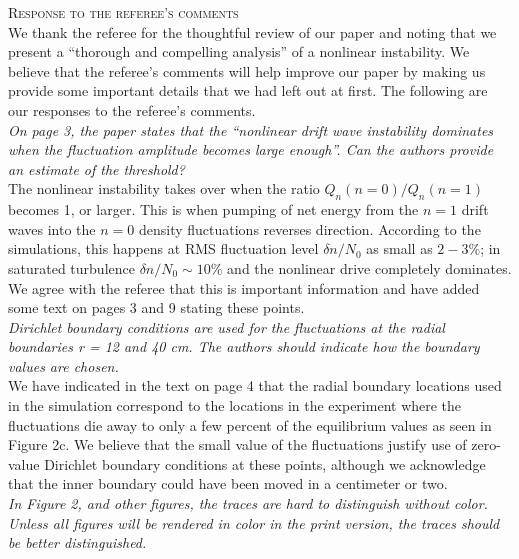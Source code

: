 \documentclass[12pt]{article}
\begin{document}
{\noindent \scshape Response to the referee's comments} \\ 

{\noindent We thank the referee for the thoughtful review of our paper and noting that we present a ``thorough and compelling analysis'' of a nonlinear instability. We believe that the referee's comments will help
improve our paper by making us provide some important details that we had left out at first. The following are our responses to the referee's comments. }\\

{\noindent \itshape  On page 3, the paper states that the “nonlinear drift wave instability dominates when
the fluctuation amplitude becomes large enough”. Can the authors provide an estimate of the threshold? }\\

{\noindent The nonlinear instability takes over when the ratio $Q_n(n=0)/Q_n(n=1)$ becomes 1, or larger. This is when pumping of net energy from the $n=1$ drift waves
into the $n=0$ density fluctuations reverses direction. According to the simulations, this happens at RMS fluctuation level $\delta n/N_0$ as small as $2-3\%$;
in saturated turbulence $\delta n/N_0 \sim 10 \%$ and the nonlinear drive completely dominates.
We agree with the referee that this is important information and have added some text on pages 3 and 9 stating these points. }\\

{\noindent \itshape    Dirichlet boundary conditions are used for the fluctuations at the radial boundaries r = 12 and 40 cm. The authors should indicate how the boundary values are chosen. }\\

{\noindent We have indicated in the text on page 4 that the radial boundary locations used in the simulation correspond to the locations in the experiment where the fluctuations die away to only
a few percent of the equilibrium values as seen in Figure 2c. We believe that the small value of the fluctuations justify use of zero-value Dirichlet boundary conditions at these points, although
we acknowledge that the inner boundary could have been moved in a centimeter or two. }\\

{\noindent \itshape  In Figure 2, and other figures, the traces are hard to distinguish without color. Unless all figures will be rendered in color in the print version, the traces should be better
distinguished. }\\
\end{document}

